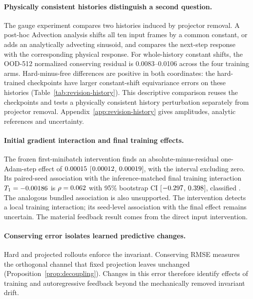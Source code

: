 \documentclass{article}
\begin{document}
\paragraph{Physically consistent histories distinguish a second question.}
The gauge experiment compares two histories induced by projector removal. A post-hoc Advection
analysis shifts all ten input frames by a common constant, or adds an analytically advecting
sinusoid, and compares the next-step response with the corresponding physical response.
For whole-history constant shifts, the OOD-512 normalized conserving residual is 0.0083--0.0106
across the four training arms. Hard-minus-free differences are positive in both coordinates:
the hard-trained checkpoints have larger constant-shift equivariance errors on these histories
(Table~\ref{tab:revision-history}). This descriptive comparison reuses the checkpoints and tests
a physically consistent history perturbation separately from projector removal.
Appendix~\ref{app:revision-history} gives amplitudes, analytic references and uncertainty.

\paragraph{Initial gradient interaction and final training effects.}

The frozen first-minibatch intervention finds an absolute-minus-residual one-Adam-step effect of
$0.00015$ [$0.00012$,
$0.00019$], with the interval excluding zero. Its paired-seed association
with the inference-matched final training interaction $T_1=-0.00186$
is $\rho=0.062$ with 95\% bootstrap CI
[$-0.297$, $0.398$], classified
\emph{\CubeMechanismClassification}. The analogous bundled association is also unsupported.
The intervention detects a local training interaction; its seed-level association with the final
effect remains uncertain. The material feedback result comes from the direct input intervention.

\paragraph{Conserving error isolates learned predictive changes.}

Hard and projected rollouts enforce the invariant. Conserving RMSE measures the orthogonal
channel that fixed projection leaves unchanged (Proposition~\ref{prop:decoupling}). Changes
in this error therefore identify effects of training and autoregressive feedback beyond the
mechanically removed invariant drift.
\end{document}
